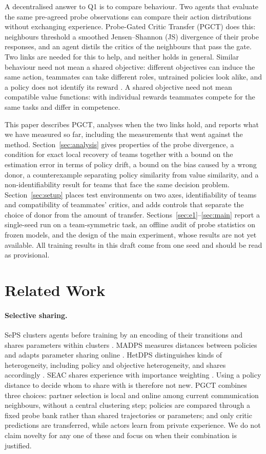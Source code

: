 \documentclass{article}
\theoremstyle{remark}
\newcommand{\ours}{PGCT}
\begin{document}
A decentralised answer to Q1 is to compare behaviour. Two agents that evaluate the same pre-agreed probe observations can
compare their action distributions without exchanging experience. Probe-Gated Critic Transfer (\ours{}) does this: neighbours
threshold a smoothed Jensen--Shannon (JS) divergence of their probe responses, and an agent distils the critics of the
neighbours that pass the gate. Two links are needed for this to help, and neither holds in general. Similar behaviour need
not mean a shared objective: different objectives can induce the same action, teammates can take different roles, untrained
policies look alike, and a policy does not identify its reward \cite{ng2000irl}. A shared objective need not mean compatible
value functions: with individual rewards teammates compete for the same tasks and differ in competence.

This paper describes \ours{}, analyses when the two links hold, and reports what we have measured so far, including the
measurements that went against the method. Section~\ref{sec:analysis} gives properties of the probe divergence, a condition
for exact local recovery of teams together with a bound on the estimation error in terms of policy drift, a bound on the bias
caused by a wrong donor, a counterexample separating policy similarity from value similarity, and a non-identifiability
result for teams that face the same decision problem. Section~\ref{sec:setup} places test environments on two axes,
identifiability of teams and compatibility of teammates' critics, and adds controls that separate the choice of donor from the
amount of transfer. Sections~\ref{sec:e1}--\ref{sec:main} report a single-seed run on a team-symmetric task, an offline audit
of probe statistics on frozen models, and the design of the main experiment, whose results are not yet available. All
training results in this draft come from one seed and should be read as provisional.

\section{Related Work}
\paragraph{Selective sharing.} SePS clusters agents before training by an encoding of their transitions and shares parameters
within clusters \cite{christianos2021seps}. MADPS measures distances between policies and adapts parameter sharing online
\cite{hu2024madps}. HetDPS distinguishes kinds of heterogeneity, including policy and objective heterogeneity, and shares
accordingly \cite{hu2026hetdps}. SEAC shares experience with importance weighting \cite{christianos2020seac}. Using a policy
distance to decide whom to share with is therefore not new. \ours{} combines three choices: partner selection is local and
online among current communication neighbours, without a central clustering step; policies are compared through a fixed
probe bank rather than shared trajectories or parameters; and only critic predictions are transferred, while actors learn
from private experience. We do not claim novelty for any one of these and focus on when their combination is justified.
\end{document}
